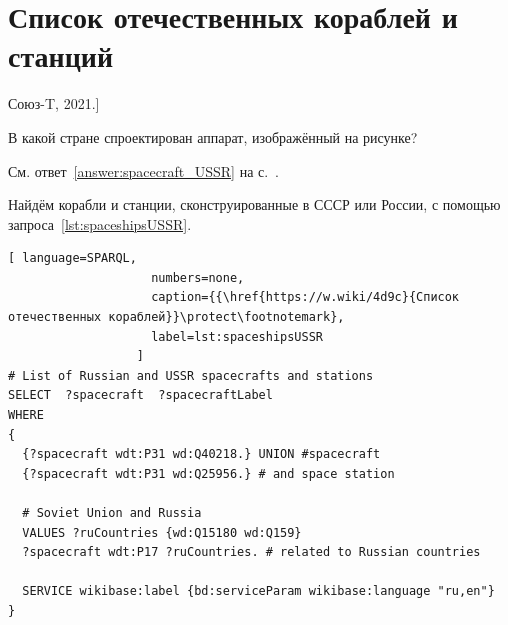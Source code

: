 \section{Список отечественных кораблей и станций}

\begin{marginfigure}
{
	\setlength{\fboxsep}{0pt}%
	\setlength{\fboxrule}{1pt}%
}
\caption
[Союз-T, 2021.]{%
В какой стране спроектирован аппарат, изображённый на рисунке?

См. ответ~\ref{answer:spacecraft_USSR} на с.~\pageref{answer:spacecraft_USSR}.
}
\label{question:spacecraft_soyuzT}
\end{marginfigure}

Найдём корабли и станции, сконструированные в СССР или России, 
с помощью запроса~\ref{lst:spaceshipsUSSR}.

\begin{lstlisting}[ language=SPARQL, 
                    numbers=none, 
                    caption={{\href{https://w.wiki/4d9c}{Список отечественных кораблей}}\protect\footnotemark}, 
                    label=lst:spaceshipsUSSR
                  ]
# List of Russian and USSR spacecrafts and stations
SELECT  ?spacecraft  ?spacecraftLabel 
WHERE
{
  {?spacecraft wdt:P31 wd:Q40218.} UNION #spacecraft
  {?spacecraft wdt:P31 wd:Q25956.} # and space station
  
  # Soviet Union and Russia
  VALUES ?ruCountries {wd:Q15180 wd:Q159}
  ?spacecraft wdt:P17 ?ruCountries. # related to Russian countries
  
  SERVICE wikibase:label {bd:serviceParam wikibase:language "ru,en"}
}
\end{lstlisting}


